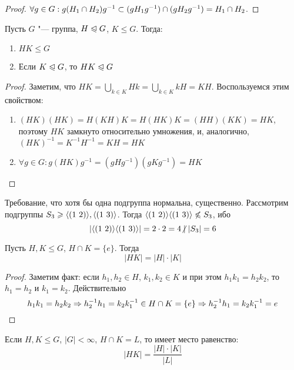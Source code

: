 \begin{proof}
	$\forall g \in G: g(H_1 \cap H_2)g^{-1} \subset (gH_1g^{-1}) \cap (gH_2g^{-1}) \hm= H_1 \cap H_2$.
\end{proof}

\begin{proposition}
	Пусть $G$ "--- группа, $H \trianglelefteqslant G$, $K \le G$. Тогда:
	\begin{enumerate}
		\item $HK \le G$
		\item Если $K \trianglelefteqslant G$, то $HK \trianglelefteqslant G$
	\end{enumerate}
\end{proposition}

\begin{proof}
	Заметим, что $HK = \bigcup_{k \in K}Hk = \bigcup_{k \in K}kH = KH$. Воспользуемся этим свойством:
	\begin{enumerate}
		\item $(HK)(HK) = H(KH)K = H(HK)K = (HH)(KK) = HK$, поэтому $HK$ замкнуто относительно умножения, и, аналогично, $(HK)^{-1} = K^{-1}H^{-1} = KH = HK$
		\item $\forall g \in G: g(HK)g^{-1} = (gHg^{-1})(gKg^{-1}) = HK$
	\end{enumerate}
\end{proof}

\begin{example}
	Требование, что хотя бы одна подгруппа нормальна, существенно. Рассмотрим подгруппы $S_3 \geqslant \langle(1\ 2)\rangle, \langle(1\ 3)\rangle$. Тогда $\gl(1\ 2)\gr\gl(1\ 3)\gr \not\le S_3$, ибо
	\[
		|\gl(1\ 2)\gr\gl(1\ 3)\gr| = 2 \cdot 2 = 4 \centernot\mid |S_3| = 6
	\]
\end{example}

\begin{proposition}
	Пусть $H, K \le G$, $H \cap K = \{e\}$. Тогда
	\[
		|HK| = |H| \cdot |K|
	\]
\end{proposition}

\begin{proof}
	Заметим факт: если $h_1, h_2 \in H$, $k_1, k_2 \in K$ и при этом $h_1k_1 = h_2k_2$, то $h_1 = h_2$ и $k_1 = k_2$. Действительно
	\[
		h_1k_1 = h_2k_2 \Rightarrow h^{-1}_2h_1 = k_2k^{-1}_1 \in H \cap K = \{e\} \Rightarrow h^{-1}_2 h_1 = k_2 k^{-1}_1 = e
	\]
\end{proof}

\begin{exercise}
	Если $H, K \le G$, $|G| < \infty$, $H \cap K = L$, то имеет место равенство:
	\[
		|HK| = \frac{|H| \cdot |K|}{|L|}
	\]
\end{exercise}

